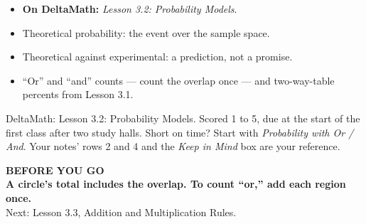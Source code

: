\documentclass[aspectratio=169, 11pt]{beamer}
\begin{document}
\begin{frame}[t, plain]
  \begin{itemize}\setlength{\itemsep}{5pt}
    \item \textbf{On DeltaMath:} \emph{Lesson 3.2: Probability Models}.
    \item Theoretical probability: the event over the sample space.
    \item Theoretical against experimental: a prediction, not a promise.
    \item ``Or'' and ``and'' counts --- count the overlap once --- and two-way-table percents
          from Lesson 3.1.
  \end{itemize}
  \begin{block}{DeltaMath: Lesson 3.2: Probability Models. Scored 1 to 5, due at the start of the first class after two study halls.}
    Short on time? Start with \emph{Probability with Or / And}. Your notes' rows 2 and 4 and the
    \emph{Keep in Mind} box are your reference.
  \end{block}
\end{frame}

{
\begin{frame}[plain]
  \vspace{1.5cm}\hspace{0.8cm}%
  \begin{minipage}{0.86\textwidth}
    {\color{goldacc}\bfseries\small BEFORE YOU GO}\\[0.7cm]
    {\color{white}\bfseries\Large A circle's total includes the overlap. To count ``or,'' add
    each region once.}\\[0.9cm]
    {\color{frostmid}\small Next: Lesson 3.3, Addition and Multiplication Rules.}
  \end{minipage}
\end{frame}
}
\end{document}
